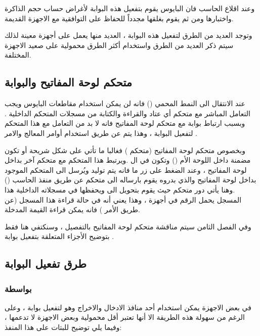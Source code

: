 \documentclass[document.tex]{subfiles}
\begin{document}
وعند اقلاع الحاسب فان البايوس يقوم بتفعيل هذه البوابة لأغراض حساب حجم الذاكرة واختبارها ومن ثم يقوم بغلقها مجدداً للحفاظ على التوافقية مع الاجهزة القديمة.

وتوجد العديد من الطرق لتفعيل هذه البوابة ، العديد منها يعمل على أجهزة معينة لذلك سيتم ذكر العديد من الطرق واستخدام أكثر الطرق محمولية على صعيد الاجهزة المختلفة.

\subsection{متحكم لوحة المفاتيح  والبوابة }
عند الانتقال الى النمط المحمي () فانه لن يمكن استخدام مقاطعات البايوس ويجب التعامل المباشر مع متحكم أي عتاد والقراءة والكتابة من مسجلات المتحكم الداخلية . وبسبب ارتباط بوابة  مع متحكم لوحة المفاتيح فانه لا بد من التعامل مع هذا المتحكم لتفعيل البوابة ، وهذا يتم عن طريق استخدام أوامر المعالج  والامر .

وبخصوص متحكم لوحة المفاتيح (متحكم ) فغالبا ما تأتي على شكل شريحة  أو تكون مضمنة داخل اللوحة الأم () وتكون في ال .ويرتبط هذا المتحكم مع متحكم آخر بداخل لوحة المفاتيح ، وعند الضغط على زر ما فانه يتم توليد  ويُرسل الى المتحكم الموجود بداخل لوحة المفاتيح والذي بدروه يقوم بارساله الى متحكم  عن طريق منفذ الحاسب () .وهنا يأتي دور متحكم  حيث يقوم بتحويل  الى  ويحفظها في مسجلاته الداخلية  هذا المسجل يحمل الرقم  في أجهزة ، وهذا يعني أنه في حالة قراءة هذا المسجل (عن طريق الأمر ) فانه يمكن قراءة القيمة المدخلة.

وفي الفصل الثامن سيتم مناقشة متحكم لوحة المفاتيح بالتفصيل ، وسنكتفي هنا فقط بتوضيح الأجزاء المتعلقة بتفعيل بوابة .



\subsection{طرق تفعيل البوابة }

\subsubsection{بواسطة }

في بعض الاجهزة يمكن استخدام أحد منافذ الادخال والاخراج وهو  لتفعيل بوابة  ، وعلى الرغم من سهولة هذه الطريقة الا أنها تعتبر أقل محمولية وبعض الاجهزة لا تدعمها ، وفيما يلي توضيح للبتات على هذا المنفذ:
\end{document}
